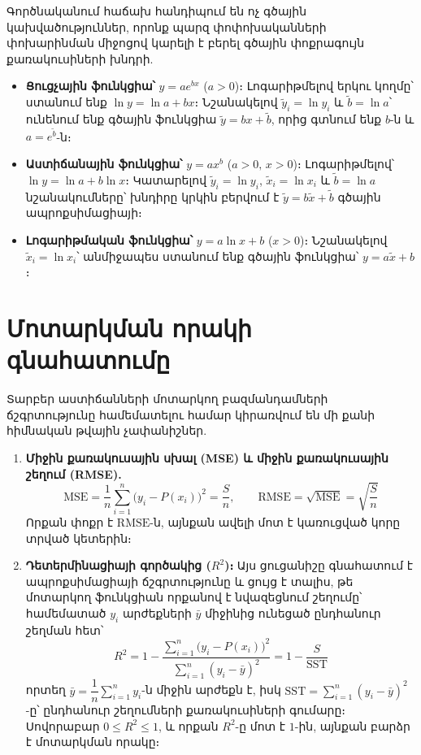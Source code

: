 \documentclass[12pt,a4paper]{article}
\numberwithin{equation}{section}
\numberwithin{figure}{section}
\begin{document}
Գործնականում հաճախ հանդիպում են ոչ գծային կախվածություններ, որոնք պարզ փոփոխականների փոխարինման միջոցով կարելի է բերել գծային փոքրագույն քառակուսիների խնդրի.
\begin{itemize}
    \item \textbf{Ցուցչային ֆունկցիա՝} $y = a e^{bx}$ ($a > 0$)։ Լոգարիթմելով երկու կողմը՝ ստանում ենք $\ln y = \ln a + bx$։ Նշանակելով $\tilde{y}_i = \ln y_i$ և $\tilde{b} = \ln a$՝ ունենում ենք գծային ֆունկցիա $\tilde{y} = bx + \tilde{b}$, որից գտնում ենք $b$-ն և $a = e^{\tilde{b}}$-ն։
    \item \textbf{Աստիճանային ֆունկցիա՝} $y = a x^b$ ($a > 0, \, x > 0$)։ Լոգարիթմելով՝ $\ln y = \ln a + b \ln x$։ Կատարելով $\tilde{y}_i = \ln y_i$, $\tilde{x}_i = \ln x_i$ և $\tilde{b} = \ln a$ նշանակումները՝ խնդիրը կրկին բերվում է $\tilde{y} = b \tilde{x} + \tilde{b}$ գծային ապրոքսիմացիայի։
    \item \textbf{Լոգարիթմական ֆունկցիա՝} $y = a \ln x + b$ ($x > 0$)։ Նշանակելով $\tilde{x}_i = \ln x_i$՝ անմիջապես ստանում ենք գծային ֆունկցիա՝ $y = a \tilde{x} + b$։
\end{itemize}

\section{Մոտարկման որակի գնահատումը}

Տարբեր աստիճանների մոտարկող բազմանդամների ճշգրտությունը համեմատելու համար կիրառվում են մի քանի հիմնական թվային չափանիշներ.
\begin{enumerate}
    \item \textbf{Միջին քառակուսային սխալ (MSE) և միջին քառակուսային շեղում (RMSE).}
    \[
    \mathrm{MSE} = \frac{1}{n} \sum_{i=1}^n \bigl(y_i - P(x_i)\bigr)^2 = \frac{S}{n}, \qquad \mathrm{RMSE} = \sqrt{\mathrm{MSE}} = \sqrt{\frac{S}{n}}
    \]
    Որքան փոքր է $\mathrm{RMSE}$-ն, այնքան ավելի մոտ է կառուցված կորը տրված կետերին։
    \item \textbf{Դետերմինացիայի գործակից ($R^2$)։} Այս ցուցանիշը գնահատում է ապրոքսիմացիայի ճշգրտությունը և ցույց է տալիս, թե մոտարկող ֆունկցիան որքանով է նվազեցնում շեղումը՝ համեմատած $y_i$ արժեքների $\bar{y}$ միջինից ունեցած ընդհանուր շեղման հետ՝
    \[
    R^2 = 1 - \frac{\sum_{i=1}^n \bigl(y_i - P(x_i)\bigr)^2}{\sum_{i=1}^n (y_i - \bar{y})^2} = 1 - \frac{S}{\mathrm{SST}}
    \]
    որտեղ $\bar{y} = \dfrac{1}{n}\sum_{i=1}^n y_i$-ն միջին արժեքն է, իսկ $\mathrm{SST} = \sum_{i=1}^n (y_i - \bar{y})^2$-ը՝ ընդհանուր շեղումների քառակուսիների գումարը։ Սովորաբար $0 \leqslant R^2 \leqslant 1$, և որքան $R^2$-ը մոտ է $1$-ին, այնքան բարձր է մոտարկման որակը։
\end{enumerate}
\end{document}

